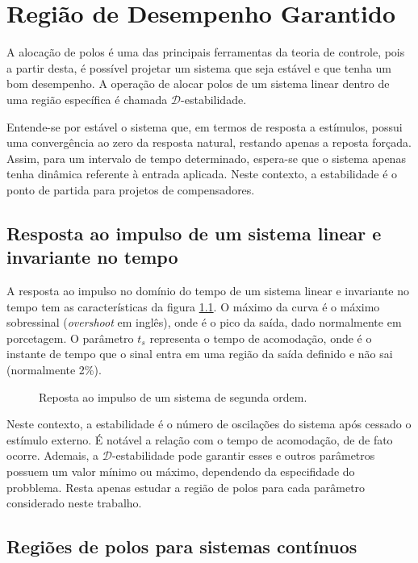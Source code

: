 \chapter{Região de Desempenho Garantido}

A alocação de polos é uma das principais ferramentas da teoria de controle, pois a partir desta, é possível projetar um sistema que seja estável e que tenha um bom desempenho\cite{ROSINOVA2014}. A operação de alocar polos de um sistema linear dentro de uma região específica é chamada $\mathscr{D}$-estabilidade\cite{CHILALI1996}.

Entende-se por estável o sistema que, em termos de resposta a estímulos, possui uma convergência ao zero da resposta natural, restando apenas a reposta forçada\cite{NISE2011}. Assim, para um intervalo de tempo determinado, espera-se que o sistema apenas tenha dinâmica referente à entrada aplicada. Neste contexto, a estabilidade é o ponto de partida para projetos de compensadores.

\section{Resposta ao impulso de um sistema linear e invariante no tempo}

A resposta ao impulso no domínio do tempo de um sistema linear e invariante no tempo tem as características da figura \ref{fig:ImpulseResponse}. O máximo da curva é o máximo sobressinal (\emph{overshoot} em inglês), onde é o pico da saída, dado normalmente em porcetagem. O parâmetro $t_s$ representa o tempo de acomodação, onde é o instante de tempo que o sinal entra em uma região da saída definido e não sai (normalmente 2\%).

\begin{figure}[!ht]
  \centering
  
  \caption{Reposta ao impulso de um sistema de segunda ordem.}
  \label{fig:ImpulseResponse}
\end{figure}

Neste contexto, a estabilidade é o número de oscilações do sistema após cessado o estímulo externo. É notável a relação com o tempo de acomodação, de de fato ocorre. Ademais, a $\mathscr{D}$-estabilidade pode garantir esses e outros parâmetros possuem um valor mínimo ou máximo, dependendo da especifidade do probblema. Resta apenas estudar a região de polos para cada parâmetro considerado neste trabalho.

\section{Regiões de polos para sistemas contínuos}\label{sec:DEstabilidadeS}

